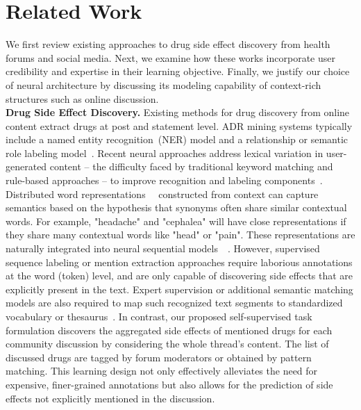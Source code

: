 \documentclass{bmcart}
\begin{document}
\section{Related Work}\label{sec:related_work}

We first review existing approaches to drug side effect discovery from health forums and social media. Next, we examine how these works incorporate user credibility and expertise in their learning objective. Finally, we justify our choice of neural architecture by discussing its modeling capability of context-rich structures such as online discussion. \\

{\bf Drug Side Effect Discovery.} Existing methods for drug discovery from online content extract drugs at post and statement level. ADR mining systems typically include 
a named entity recognition~(NER) model and a relationship or semantic role labeling model~\cite{sampathkumar2014mining,liu2018patient}. 
Recent neural approaches address lexical variation in user-generated content -- the difficulty faced by traditional keyword matching and rule-based approaches -- to improve recognition and labeling components~\cite{ding2018attentive,wunnava2019adverse}. 
Distributed word representations~\cite{mikolov2013distributed}~\cite{pennington2014glove} constructed from context can capture semantics based on the hypothesis that synonyms often share similar contextual words. For example, "headache" and "cephalea" will have close representations if they share many contextual words like "head" or "pain". These representations are naturally integrated into neural sequential models~\cite{kim2014convolutional}~\cite{sutskever2014sequence}. 
However, supervised sequence labeling or mention extraction approaches require laborious annotations at the word (token) level, and are only capable of discovering side effects that are explicitly present in the text. Expert supervision or additional semantic matching models are also required to map such recognized text segments to standardized vocabulary or thesaurus~\cite{yates2015extracting}. In contrast, our proposed self-supervised task formulation discovers the aggregated side effects of mentioned drugs for each community discussion by considering the whole thread's content. The list of discussed drugs are tagged by forum moderators or obtained by pattern matching. This learning design not only effectively alleviates the need for expensive, finer-grained annotations but also allows for the prediction of side effects not explicitly mentioned in the discussion. \\
\end{document}
